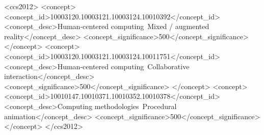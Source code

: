 \begin{CCSXML}
    <ccs2012>
        <concept>
            <concept_id>10003120.10003121.10003124.10010392</concept_id>
            <concept_desc>Human-centered computing~Mixed / augmented reality</concept_desc>
            <concept_significance>500</concept_significance>
        </concept>
        <concept>
            <concept_id>10003120.10003121.10003124.10011751</concept_id>
            <concept_desc>Human-centered computing~Collaborative interaction</concept_desc>
            <concept_significance>500</concept_significance>
        </concept>
        <concept>
            <concept_id>10010147.10010371.10010352.10010378</concept_id>
            <concept_desc>Computing methodologies~Procedural animation</concept_desc>
            <concept_significance>500</concept_significance>
            </concept>
      </ccs2012>
\end{CCSXML}


